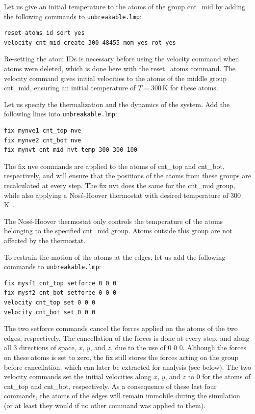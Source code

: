 \documentclass[9pt,tutorial]{livecoms}
\newcommand{\lmpcmd}[1]{\hspace{0pt}\colorbox{listing}{\textcolor{command}{\small{#1}}}\hspace{0pt}} %
\newcommand{\flecmd}[1]{\textcolor{command}{\texttt{#1}}} %
\begin{document}
Let us give an initial temperature to the atoms of the group \lmpcmd{cnt\_mid}
by adding the following commands to \flecmd{unbreakable.lmp}:
\begin{lstlisting}
reset_atoms id sort yes
velocity cnt_mid create 300 48455 mom yes rot yes
\end{lstlisting}
Re-setting the atom IDs is necessary before using the \lmpcmd{velocity} command
when atoms were deleted, which is done here with the \lmpcmd{reset\_atoms} command.
The \lmpcmd{velocity} command gives initial velocities to the atoms of the middle
group \lmpcmd{cnt\_mid}, ensuring an initial temperature of $T = 300\,\text{K}$
for these atoms.

Let us specify the thermalization and the dynamics of the system.  Add the following
lines into \flecmd{unbreakable.lmp}:
\begin{lstlisting}
fix mynve1 cnt_top nve
fix mynve2 cnt_bot nve
fix mynvt cnt_mid nvt temp 300 300 100
\end{lstlisting}
The \lmpcmd{fix nve} commands are applied to the atoms of \lmpcmd{cnt\_top} and
\lmpcmd{cnt\_bot}, respectively, and will ensure that the positions of the atoms
from these groups are recalculated at every step.  The \lmpcmd{fix nvt} does the
same for the \lmpcmd{cnt\_mid} group, while also applying a Nos\'e-Hoover thermostat
with desired temperature of 300\,K~\cite{nose1984unified, hoover1985canonical}.

\begin{note}
{\color{blue}The Nosé-Hoover thermostat only controls the temperature of
the atoms belonging to the specified \lmpcmd{cnt\_mid} group. Atoms outside
this group are not affected by the thermostat.}
\end{note}

To restrain the motion of the atoms at the edges, let us add the following
commands to \flecmd{unbreakable.lmp}:
\begin{lstlisting}
fix mysf1 cnt_top setforce 0 0 0
fix mysf2 cnt_bot setforce 0 0 0
velocity cnt_top set 0 0 0
velocity cnt_bot set 0 0 0
\end{lstlisting}
The two \lmpcmd{setforce} commands cancel the forces applied on the atoms of the
two edges, respectively.  The cancellation of the forces is done at every step,
and along all 3 directions of space, $x$, $y$, and $z$, due to the use of
\lmpcmd{0 0 0}.  {\color{blue}Although the forces on these atoms is set to zero,
the \lmpcmd{fix} still stores the forces acting on the group before
cancellation, which can later be extracted for analysis (see below).} 
The two \lmpcmd{velocity} commands set the initial velocities
along $x$, $y$, and $z$ to 0 for the atoms of \lmpcmd{cnt\_top} and
\lmpcmd{cnt\_bot}, respectively.  As a consequence of these last four commands,
the atoms of the edges will remain immobile during the simulation (or at least
they would if no other command was applied to them).
\end{document}
